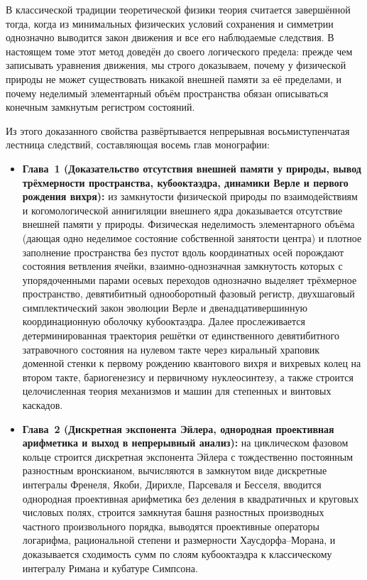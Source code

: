 В классической традиции теоретической физики теория считается завершённой тогда, когда из минимальных физических условий сохранения и симметрии однозначно выводится закон движения и все его наблюдаемые следствия. В настоящем томе этот метод доведён до своего логического предела: прежде чем записывать уравнения движения, мы строго доказываем, почему у физической природы не может существовать никакой внешней памяти за её пределами, и почему неделимый элементарный объём пространства обязан описываться конечным замкнутым регистром состояний.

Из этого доказанного свойства развёртывается непрерывная восьмиступенчатая лестница следствий, составляющая восемь глав монографии:
\begin{itemize}[leftmargin=*,noitemsep]
\item \textbf{Глава~1 (Доказательство отсутствия внешней памяти у природы, вывод трёхмерности пространства, кубооктаэдра, динамики Верле и первого рождения вихря):} из замкнутости физической природы по взаимодействиям и когомологической аннигиляции внешнего ядра доказывается отсутствие внешней памяти у природы. Физическая неделимость элементарного объёма (дающая одно неделимое состояние собственной занятости центра) и плотное заполнение пространства без пустот вдоль координатных осей порождают состояния ветвления ячейки, взаимно-однозначная замкнутость которых с упорядоченными парами осевых переходов однозначно выделяет трёхмерное пространство, девятибитный однооборотный фазовый регистр, двухшаговый симплектический закон эволюции Верле и двенадцативершинную координационную оболочку кубооктаэдра. Далее прослеживается детерминированная траектория решётки от единственного девятибитного затравочного состояния на нулевом такте через киральный храповик доменной стенки к первому рождению квантового вихря и вихревых колец на втором такте, бариогенезису и первичному нуклеосинтезу, а также строится целочисленная теория механизмов и машин для степенных и винтовых каскадов.
\item \textbf{Глава~2 (Дискретная экспонента Эйлера, однородная проективная арифметика и выход в непрерывный анализ):} на циклическом фазовом кольце строится дискретная экспонента Эйлера с тождественно постоянным разностным вронскианом, вычисляются в замкнутом виде дискретные интегралы Френеля, Якоби, Дирихле, Парсеваля и Бесселя, вводится однородная проективная арифметика без деления в квадратичных и круговых числовых полях, строится замкнутая башня разностных производных частного произвольного порядка, выводятся проективные операторы логарифма, рациональной степени и размерности Хаусдорфа--Морана, и доказывается сходимость сумм по слоям кубооктаэдра к классическому интегралу Римана и кубатуре Симпсона.

\end{itemize}
